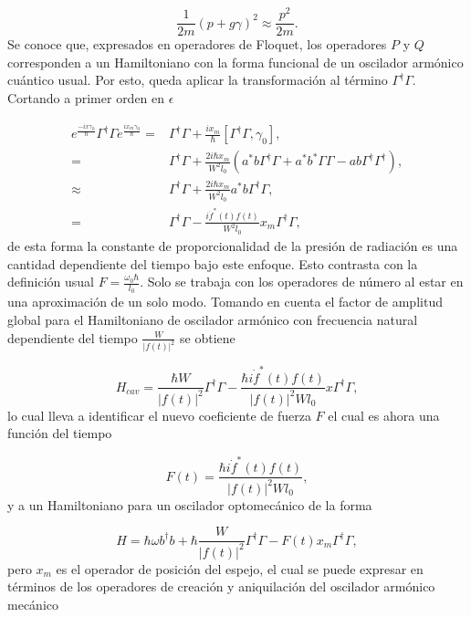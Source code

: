 \documentclass[10pt,a4paper]{report}
\begin{document}
\begin{equation}
\frac{1}{2m}(p + g \gamma)^2 \approx \frac{p^2}{2m}.
\end{equation} Se conoce que, expresados en operadores de Floquet, los operadores $P$ y $Q$ corresponden a un Hamiltoniano con la forma funcional de un oscilador armónico cuántico usual. Por esto, queda aplicar la transformación al término $\Gamma^\dagger \Gamma$. Cortando a primer orden en $\epsilon$

\begin{align*}
e^{\frac{-ix\gamma_0}{\hbar}}\Gamma^\dagger \Gamma e^{\frac{ix_m\gamma_0}{\hbar}} =& \Gamma^\dagger \Gamma + \frac{ix_m}{\hbar}[\Gamma^\dagger \Gamma, \gamma_0], \\
=& \Gamma^\dagger \Gamma + \frac{2i\hbar x_m}{W^2 l_0}(a^*b \Gamma^\dagger \Gamma + a^*b^* \Gamma \Gamma -ab\Gamma^\dagger \Gamma^\dagger),\\
\approx & \Gamma^\dagger \Gamma + \frac{2i\hbar x_m}{W^2 l_0} a^*b \Gamma^\dagger \Gamma, \\
=& \Gamma^\dagger \Gamma - \frac{i \dot{f}^*(t)f(t) }{W^2 l_0} x_m  \Gamma^\dagger \Gamma,
\end{align*} de esta forma la constante de proporcionalidad de la presión de radiación es una cantidad dependiente del tiempo bajo este enfoque. Esto contrasta con la definición usual $F= \frac{\omega_0 \hbar}{l_0}$. Solo se trabaja con los operadores de número al estar en una aproximación de un solo modo. Tomando en cuenta el factor de amplitud global para el Hamiltoniano de oscilador armónico con frecuencia natural dependiente del tiempo $\frac{W}{|f(t)|^2}$ se obtiene

\begin{equation}
H_{cav} = \frac{\hbar W}{|f(t)|^2}\Gamma^\dagger \Gamma - \frac{\hbar i\dot{f}^*(t)f(t) }{|f(t)|^2W l_0}x  \Gamma^ \dagger \Gamma,
\end{equation} lo cual lleva a identificar el nuevo coeficiente de fuerza $F$ el cual es ahora una función del tiempo

\begin{equation}
F(t) = \frac{\hbar i\dot{f}^*(t)f(t) }{|f(t)|^2W l_0},
\end{equation} y a un Hamiltoniano para un oscilador optomecánico de la forma

\begin{equation}
H = \hbar \omega b^\dagger b + \hbar\frac{ W}{|f(t)|^2}\Gamma^\dagger \Gamma -F(t)x_m\Gamma^\dagger \Gamma,
\end{equation} pero $x_m$ es el operador de posición del espejo, el cual se puede expresar en términos de los operadores de creación y aniquilación del oscilador armónico mecánico
\end{document}
